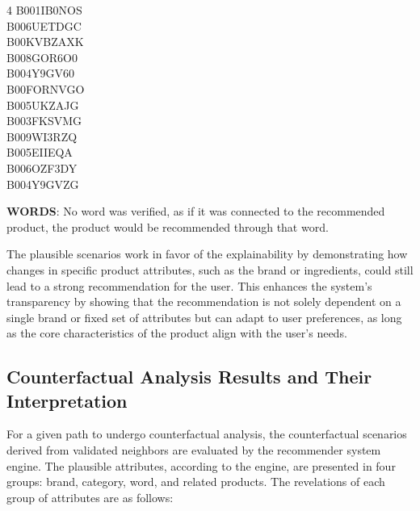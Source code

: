 \begin{multicols}{4}
	B001IB0NOS\\ B006UETDGC\\ B00KVBZAXK\\ B008GOR6O0\\ B004Y9GV60\\ B00FORNVGO\\
	B005UKZAJG\\ B003FKSVMG\\ B009WI3RZQ\\ B005EIIEQA\\ B006OZF3DY\\ B004Y9GVZG
\end{multicols}


\textbf{WORDS}: No word was verified, as if it was connected to the recommended product,
the product would be recommended through that word.






The plausible scenarios work in favor of the explainability by demonstrating how
changes in specific product attributes, such as the brand or ingredients, could
still lead to a strong recommendation for the user. This enhances the system's transparency
by showing that the recommendation is not solely dependent on a single brand or fixed
set of attributes but can adapt to user preferences, as long as the core
characteristics of the product align with the user's needs.

\subsection*{Counterfactual Analysis Results and Their Interpretation}
For a given path to undergo counterfactual analysis, the counterfactual
scenarios derived from validated neighbors are evaluated by the recommender
system engine. The plausible attributes, according to the engine, are presented in
four groups: brand, category, word, and related products. The revelations of
each group of attributes are as follows:

